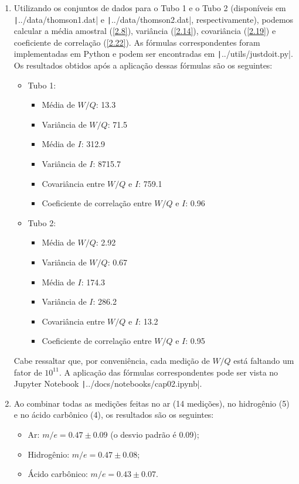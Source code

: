 \begin{enumerate}[label=\textbf{2.\arabic*.}]
	\item Utilizando os conjuntos de dados para o Tubo 1 e o Tubo 2 (disponíveis em \texttt|../data/thomson1.dat| e \texttt|../data/thomson2.dat|, respectivamente), podemos calcular a média amostral (\autoref{2.8}), variância (\autoref{2.14}), covariância (\autoref{2.19}) e coeficiente de correlação (\autoref{2.22}). As fórmulas correspondentes foram implementadas em Python e podem ser encontradas em \texttt|../utils/justdoit.py|. Os resultados obtidos após a aplicação dessas fórmulas são os seguintes:
	
	\begin{itemize}
		\item Tubo 1:
		\begin{itemize}
			\item Média de $W/Q$: 13.3
			\item Variância de $W/Q$: 71.5
			\item Média de $I$: 312.9
			\item Variância de $I$: 8715.7
			\item Covariância entre $W/Q$ e $I$: 759.1
			\item Coeficiente de correlação entre $W/Q$ e $I$: 0.96
		\end{itemize}
		
		\item Tubo 2:
		\begin{itemize}
			\item Média de $W/Q$: 2.92
			\item Variância de $W/Q$: 0.67
			\item Média de $I$: 174.3
			\item Variância de $I$: 286.2
			\item Covariância entre $W/Q$ e $I$: 13.2
			\item Coeficiente de correlação entre $W/Q$ e $I$: 0.95
		\end{itemize}
	\end{itemize}
	
	Cabe ressaltar que, por conveniência, cada medição de $W/Q$ está faltando um fator de $10^{11}$. A aplicação das fórmulas correspondentes pode ser vista no Jupyter Notebook \texttt|../docs/notebooks/cap02.ipynb|.
	
	\item Ao combinar todas as medições feitas no ar (14 medições), no hidrogênio (5) e no ácido carbônico (4), os resultados são os seguintes:
	
	\begin{itemize}
	\item Ar: $m/e = 0.47 \pm 0.09$ (o desvio padrão é 0.09);		
	\item Hidrogênio: $m/e = 0.47 \pm 0.08$;
	\item Ácido carbônico: $m/e = 0.43 \pm 0.07$.
	\end{itemize}	
	

\end{enumerate}
